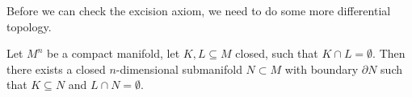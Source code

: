 \documentclass[a4paper,11pt]{article}
\begin{document}
\begin{comment}[Transversality, Sard, Mayer-Vi\"etoris,...]
Before checking the next axioms, we need to do some more differential topology. (Maybe I will put this in chapter 1\dots)

\begin{definition}[Tangent space\ \cite{lee}]
\end{definition}

Need a few more things, differential, etc.

\begin{definition}[Transversality\ \cite{brocker}]
    Let \(f:M\to N\) a smooth map between manifolds. Let \(U\subseteq N\) be an (\(n-k\))-dimensional submanifold of \(N\) 
\end{definition}
Maybe Lee's definition is better.\\

\begin{definition}[Regular value]
\end{definition}

\begin{theorem}[Sard's theorem\ \cite{lee}]
\end{theorem}

I will not prove this theorem, a proof can be found in\ \cite{lee}.

\begin{definition}[Seperating function\cite{brocker}]
\end{definition}

\begin{lemma}
    Slogan: The Mayer-Vi\"etoris sequence is equivalent to the excision axiom.
\end{lemma}

\begin{lemma}
    The Mayer-Vi\"etoris sequence
    \[\dots\xrightarrow{\partial}\mathfrak{N}_n(X_0\cap X_1)\xrightarrow{\alpha}\mathfrak{N}_n(X_0\oplus\mathfrak{N}_n(X_1))\xrightarrow{\beta}\mathfrak{N}_n(X)\xrightarrow{\partial}\mathfrak{N}_{n-1}(X_0\cap X_1)\xrightarrow{\alpha}\dots\]
    is exact.
\end{lemma}

\end{comment}

Before we can check the excision axiom, we need to do some more differential topology.

\begin{lemma}\label{plemma}%
    Let \(M^n\) be a compact manifold, let \(K,L\subseteq M\) closed, such that \(K\cap L=\emptyset\). Then there exists a closed \(n\)-dimensional submanifold \(N\subset M\) with boundary \(\partial N\) such that \(K\subseteq N\) and \(L\cap N=\emptyset\).
\end{lemma}
\end{document}
